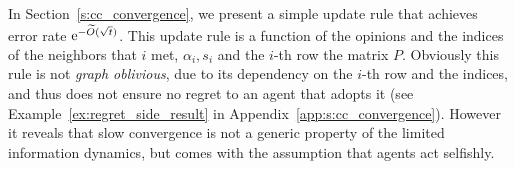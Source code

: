 In Section~\ref{s:cc_convergence}, we present a simple update rule that
achieves error rate $\mathrm{e}^{-\widetilde{O}(\sqrt{t})}$.
This update rule is a function of the opinions and the indices of the neighbors
that $i$ met, $\alpha_i,s_i$ and the $i$-th row the matrix $P$. Obviously
this rule is not \emph{graph oblivious}, due to its dependency on the $i$-th row
and the indices, 
and thus does not ensure no regret to an agent that adopts it 
(see Example~\ref{ex:regret_side_result} in Appendix~\ref{app:s:cc_convergence}).
However it reveals that slow convergence is not a generic property of 
the limited information dynamics, but comes with the assumption that 
agents act selfishly.
